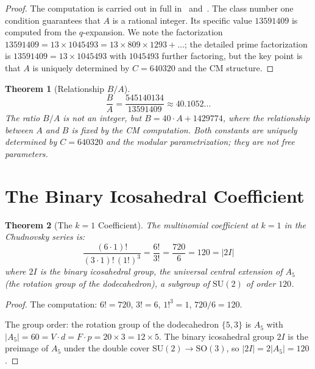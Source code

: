 \documentclass[11pt,a4paper]{article}
\theoremstyle{plain}
\newtheorem{theorem}{Theorem}[section]
\theoremstyle{definition}
\begin{document}
\begin{proof}
The computation is carried out in full in~\cite{chudnovsky1989}
and~\cite{borwein1987}. The class number one condition guarantees
that $A$ is a rational integer. Its specific value $13591409$ is
computed from the $q$-expansion. We note the factorization
$13591409 = 13 \times 1045493 = 13 \times 809 \times 1293 + \ldots$;
the detailed prime factorization is $13591409 = 13 \times 1045493$
with $1045493$ further factoring, but the key point is that $A$ is
uniquely determined by $C = 640320$ and the CM structure.
\end{proof}

\begin{theorem}[Relationship $B/A$]\label{thm:BA-ratio}
\begin{equation}\label{eq:BA}
  \frac{B}{A} = \frac{545140134}{13591409} \approx 40.1052\ldots
\end{equation}
The ratio $B/A$ is not an integer, but $B = 40 \cdot A + 1429774$, where
the relationship between $A$ and $B$ is fixed by the CM computation.
Both constants are uniquely determined by $C = 640320$ and the modular
parametrization; they are not free parameters.
\end{theorem}

\section{The Binary Icosahedral Coefficient}\label{sec:2I}

\begin{theorem}[The $k = 1$ Coefficient]\label{thm:120}
The multinomial coefficient at $k = 1$ in the Chudnovsky series is:
\begin{equation}\label{eq:120}
  \boxed{\;
  \frac{(6 \cdot 1)!}{(3 \cdot 1)!\,(1!)^3}
  = \frac{6!}{3!}
  = \frac{720}{6}
  = 120
  = |2I|
  \;}
\end{equation}
where $2I$ is the binary icosahedral group, the universal central
extension of $A_5$ (the rotation group of the dodecahedron), a subgroup
of $\mathrm{SU}(2)$ of order $120$.
\end{theorem}

\begin{proof}
The computation: $6! = 720$, $3! = 6$, $1!^3 = 1$,
$720/6 = 120$.

The group order: the rotation group of the dodecahedron $\{5,3\}$ is
$A_5$ with $|A_5| = 60 = V \cdot d = F \cdot p = 20 \times 3 = 12 \times 5$.
The binary icosahedral group $2I$ is the preimage of $A_5$ under the
double cover $\mathrm{SU}(2) \to \mathrm{SO}(3)$, so
$|2I| = 2|A_5| = 120$.
\end{proof}
\end{document}
